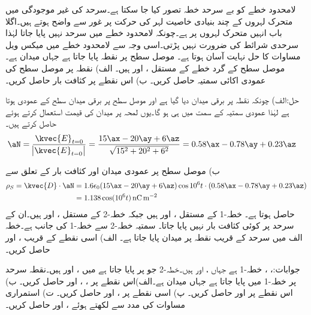 لامحدود خطے کو بے سرحد خطہ تصور کیا جا سکتا ہے۔سرحد کی غیر موجودگی میں متحرک لہروں کے چند بنیادی خاصیت لہر کی حرکت پر غور سے واضح ہوتے ہیں۔اگلا باب انہیں متحرک لہروں پر ہے۔چونکہ لامحدود خطے میں سرحد نہیں پایا جاتا لہٰذا سرحدی شرائط کی ضرورت نہیں پڑتی۔اسی وجہ سے لامحدود خطے میں میکس ویل مساوات کا حل نہایت آسان ہوتا ہے۔ 
موصل سطح پر نقطہ  پایا جاتا ہے جہاں میدان  ہے۔موصل سطح کے گرد خطے کے مستقل ،  اور  ہیں۔ الف) نقطہ  پر موصل سطح کی عمودی اکائی سمتیہ  حاصل کریں۔ ب) اس نقطے پر کثافت بار حاصل کریں۔

حل:الف) چونکہ نقطہ  پر برقی میدان دیا گیا ہے اور موصل سطح پر برقی میدان سطح کے عمودی ہوتا ہے لہٰذا عمودی سمتیہ  کے سمت میں ہی ہو گا۔یوں لمحہ  پر میدان کی قیمت استعمال کرتے ہوئے  حاصل کرتے ہیں۔
\begin{align*}
\aN=\frac{\kvec{E}_{t=0}}{\abs{\kvec{E}_{t=0}}}&=\frac{15\ax-20\ay+6\az }{\sqrt{15^2+20^2+6^2}}=0.58\ax-0.78\ay+0.23\az
\end{align*}

ب) موصل سطح پر عمودی میدان اور کثافت بار کے تعلق سے
\begin{align*}
\rho_S=\kvec{D} \cdot \aN&=1.6\epsilon_0 (15\ax-20\ay+6\az)\cos 10^6 t \cdot (0.58\ax-0.78\ay+0.23\az)\\
&=1.138 \cos(10^6 t) \, \si{\nano \coulomb \per\meter\squared}
\end{align*}
حاصل ہوتا ہے۔
خطہ-1 کے مستقل ،  اور  ہیں جبکہ خطہ-2 کے مستقل ،  اور  ہیں۔ان کے سرحد پر کوئی کثافت بار نہیں پایا جاتا۔ سمتیہ  خطہ-2 سے خطہ-1 کی جانب ہے۔خطہ الف میں سرحد کے قریب نقطہ  پر میدان  پایا جاتا ہے۔ الف) اسی نقطے کے قریب ،  اور  حاصل کریں۔

جوابات:، ، 
 خطہ-1 ہے جہاں ،  اور  ہیں۔خطہ-2 جو  پر پایا جاتا ہے میں ، 
 اور  ہیں۔نقطہ  سرحد پر خطہ-1 میں پایا جاتا ہے جہاں میدان
  ہے۔الف)اس نقطے پر ، ،  اور  حاصل کریں۔ ب) اس نقطے پر  اور  حاصل کریں۔ پ) اسی نقطے پر ،  اور  حاصل کریں۔ ت) استمراری مساوات کی مدد
 سے  لکھتے ہوئے ،  اور  حاصل کریں۔


